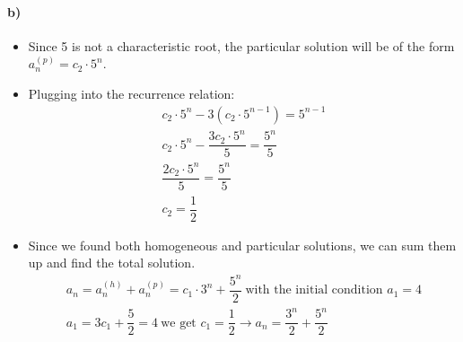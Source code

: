 \documentclass[12pt]{article}
\begin{document}
\paragraph*{b)}
\begin{itemize}
    \item Since 5 is not a characteristic root, the particular solution will be of the form $a_n^{(p)} = c_2\cdot5^n$.
    \item Plugging into the recurrence relation:
    \begin{equation*}
        \begin{split}
            c_2\cdot5^n - 3(c_2\cdot5^{n-1}) = 5^{n-1}\\
            c_2\cdot5^n - \dfrac{3c_2\cdot5^n}{5} = \dfrac{5^n}{5}\\
            \dfrac{2c_2\cdot5^n}{5} = \dfrac{5^n}{5}\\
            c_2 = \dfrac{1}{2}
        \end{split}
    \end{equation*}
    \item Since we found both homogeneous and particular solutions, we can sum them up and find the total solution.
    \begin{equation*}
        \begin{split}
            a_n = a_n^{(h)} + a_n^{(p)} = c_1\cdot3^n + \dfrac{5^n}{2} \ \text{with the initial condition $a_1 = 4$}\\
            a_1 = 3c_1 + \dfrac{5}{2} = 4 \ \text{we get $c_1 = \dfrac{1}{2}$} \rightarrow
            a_n = \dfrac{3^n}{2} + \dfrac{5^n}{2}
        \end{split}
    \end{equation*}
\end{itemize}
\end{document}
